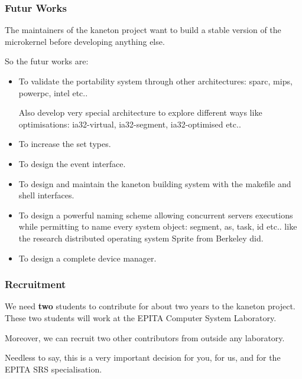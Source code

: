
\begin{frame}
  \frametitle{Futur Works}

  The maintainers of the kaneton project want to build a stable version
  of the microkernel before developing anything else.

  \nl

  So the futur works are:

  \begin{itemize}[<+->]
    \item
      To validate the portability system through other architectures:
      sparc, mips, powerpc, intel etc..

      \nl

      Also develop very special architecture to explore different ways
      like optimisations: ia32-virtual, ia32-segment, ia32-optimised etc..
    \item
      To increase the set types.
    \item
      To design the event interface.
    \item
      To design and maintain the kaneton building system with the
      makefile and shell interfaces.
    \item
      To design a powerful naming scheme allowing concurrent
      servers executions while permitting to name every system object:
      segment, as, task, id etc.. like the research distributed operating
      system Sprite from Berkeley did.
    \item
      To design a complete device manager.
  \end{itemize}
\end{frame}


\begin{frame}
  \frametitle{Recruitment}

  We need \textbf{two} students to contribute for about two years to
  the kaneton project. These two students will work at the EPITA Computer
  System Laboratory.

  \nl

  Moreover, we can recruit two other contributors from outside any laboratory.

  \nl

  Needless to say, this is a very important decision for you, for us,
  and for the EPITA SRS specialisation.
\end{frame}



